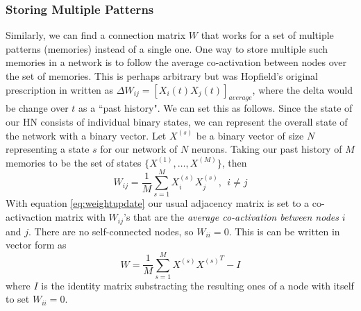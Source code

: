 \documentclass[11pt]{article}
\begin{document}
	\subsubsection{Storing Multiple Patterns}
	Similarly, we can find a connection matrix $W$ that works for a set of multiple patterns (memories) instead of a single one.
	 One way to store multiple such memories in a network is to follow the average co-activation between nodes over the set of memories. 
	 This is perhaps arbitrary but was Hopfield's original prescription in \cite{hopfield1982neural} written as $\Delta W_{ij} = [X_i(t) X_j(t)]_{average}$, where the delta would be change over $t$ as a ``past history".
	 We can set this as follows. Since the state of our HN consists of individual binary states, we can represent the overall state of the network with a binary vector. 
	 Let $X^{(s)}$ be a binary vector of size $N$ representing a state $s$ for our network of $N$ neurons.  
	 Taking our past history of $M$ memories to be the set of states  $\{ X^{(1)}, \ldots, X^{(M)} \}$, then
	\begin{equation}\label{eq:weightupdate}
		W_{ij} = \frac{1}{M} \sum^{M}_{s=1} X^{(s)}_i X_j^{(s)}, \ \ i \neq j
	\end{equation}
	With equation \ref{eq:weightupdate} our usual adjacency matrix is set to a co-activaction matrix with $W_{ij}$'s that are the \textit{average co-activation between nodes} $i$ and $j$. There are no self-connected nodes, so $W_{ii} = 0$. 
	This is can be written in vector form as
	\begin{equation}
	W = \frac{1}{M} \sum^{M}_{s=1} X^{(s)} {X^{(s)}}^T - I
	\end{equation}
	where $I$ is the identity matrix substracting the resulting ones of a node with itself to set $W_{ii} = 0$.
	
\end{document}
